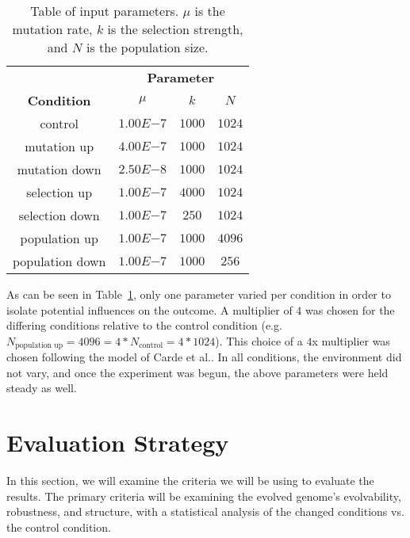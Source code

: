 \begin{table}[h]
	\centering
	\begin{tabular}{|c||c|c|c|}
		\hline
		 & \multicolumn{3}{c|}{\textbf{Parameter}} \\
		\cline{2-4}
		\textbf{Condition} &$\mu$ & $k$ & $N$ \\
		\hline
		control & $1.00E{-7}$ & $1000$ & $1024$ \\
		\hline
		mutation up & $4.00E{-7}$ & $1000$ & $1024$ \\
		\hline
		mutation down & $2.50E{-8}$ & $1000$ & $1024$ \\
		\hline
		selection up & $1.00E{-7}$ & $4000$ & $1024$ \\
		\hline
		selection down & $1.00E{-7}$ & $250$ & $1024$ \\
		\hline
		population up & $1.00E{-7}$ & $1000$ & $4096$ \\
		\hline
		population down & $1.00E{-7}$ & $1000$ & $256$ \\		
		\hline
	\end{tabular}
	\caption[Table of parameters]{Table of input parameters. $\mu$ is the mutation rate, $k$ is the selection strength, and $N$ is the population size.}
	\label{table:input_parameters}
\end{table}
As can be seen in Table~\ref{table:input_parameters}, only one parameter varied per condition in order to isolate potential influences on the outcome. A multiplier of $4$ was chosen for the differing conditions relative to the control condition (e.g. $N_\text{population up} = 4096 = 4*N_\text{control} = 4*1024$). This choice of a $4$x multiplier was chosen following the model of Carde et al.\cite{carde.2019}. In all conditions, the environment did not vary, and once the experiment was begun, the above parameters were held steady as well. 


\section{Evaluation Strategy}
In this section, we will examine the criteria we will be using to evaluate the results. The primary criteria will be examining the evolved genome's evolvability, robustness, and structure, with a statistical analysis of the changed conditions vs. the control condition. 

